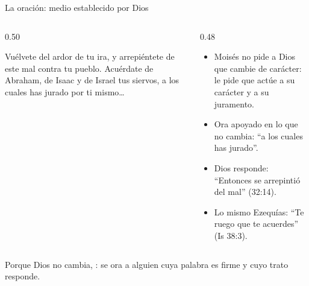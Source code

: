 \begin{frame}{La oración: medio establecido por Dios}
\begin{columns}[t,onlytextwidth]
\begin{column}{0.50\textwidth}
\begin{cita}Vuélvete del ardor de tu ira, y arrepiéntete de este mal contra tu pueblo. Acuérdate de Abraham, de Isaac y de Israel tus siervos, a los cuales has jurado por ti mismo\ldots{}\end{cita}
\end{column}
\begin{column}{0.48\textwidth}\small
\begin{itemize}
\item Moisés no pide a Dios que cambie de carácter: le pide que actúe  a su carácter y a su juramento.
\item Ora apoyado en lo que no cambia: ``a los cuales has jurado''.
\item Dios responde: ``Entonces \SENOR{} se arrepintió del mal'' (32:14).
\item Lo mismo Ezequías: ``Te ruego que te acuerdes'' (Is 38:3).
\end{itemize}
\end{column}
\end{columns}\par\smallskip
\small\RaggedRight Porque Dios no cambia, : se ora a alguien cuya palabra es firme y cuyo trato responde.
\end{frame}

